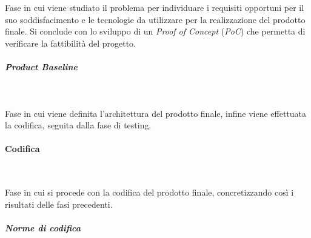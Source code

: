 \noindent Fase in cui viene studiato il problema per individuare i requisiti opportuni per il suo soddisfacimento e le tecnologie da utilizzare per la realizzazione del prodotto finale. \newline
Si conclude con lo sviluppo di un \textit{Proof of Concept} (\textit{PoC}) che permetta di verificare la fattibilità del progetto.

\subparagraph{Product Baseline}~

\noindent Fase in cui viene definita l'architettura del prodotto finale, infine viene effettuata la codifica, seguita dalla fase di testing.


\paragraph{Codifica}~

\noindent Fase in cui si procede con la codifica del prodotto finale, concretizzando così i risultati delle fasi precedenti.

\subparagraph{Norme di codifica}~

